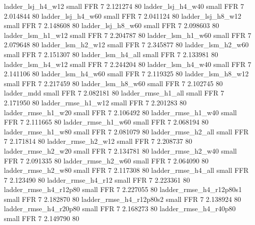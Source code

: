        ladder_lsj_h4_w12      small      FFR                 7 2.121274 80
       ladder_lsj_h4_w40      small      FFR                 7 2.014844 80
       ladder_lsj_h4_w60      small      FFR                 7 2.041124 80
       ladder_lsj_h8_w12      small      FFR                 7 2.148608 80
       ladder_lsj_h8_w60      small      FFR                 7 2.098603 80
       ladder_lsm_h1_w12      small      FFR                 7 2.204787 80
       ladder_lsm_h1_w60      small      FFR                 7 2.079648 80
       ladder_lsm_h2_w12      small      FFR                 7 2.345877 80
       ladder_lsm_h2_w60      small      FFR                 7 2.151307 80
       ladder_lsm_h4_all      small      FFR                 7 2.133981 80
       ladder_lsm_h4_w12      small      FFR                 7 2.244204 80
       ladder_lsm_h4_w40      small      FFR                 7 2.141106 80
       ladder_lsm_h4_w60      small      FFR                 7 2.119325 80
       ladder_lsm_h8_w12      small      FFR                 7 2.217459 80
       ladder_lsm_h8_w60      small      FFR                 7 2.102745 80
              ladder_mdd      small      FFR                 7 2.082181 80
      ladder_rmse_h1_all      small      FFR                 7 2.171950 80
      ladder_rmse_h1_w12      small      FFR                 7 2.201283 80
      ladder_rmse_h1_w20      small      FFR                 7 2.106492 80
      ladder_rmse_h1_w40      small      FFR                 7 2.111665 80
      ladder_rmse_h1_w60      small      FFR                 7 2.068194 80
      ladder_rmse_h1_w80      small      FFR                 7 2.081079 80
      ladder_rmse_h2_all      small      FFR                 7 2.171814 80
      ladder_rmse_h2_w12      small      FFR                 7 2.208737 80
      ladder_rmse_h2_w20      small      FFR                 7 2.134781 80
      ladder_rmse_h2_w40      small      FFR                 7 2.091335 80
      ladder_rmse_h2_w60      small      FFR                 7 2.064090 80
      ladder_rmse_h2_w80      small      FFR                 7 2.117308 80
      ladder_rmse_h4_all      small      FFR                 7 2.123490 80
      ladder_rmse_h4_r12      small      FFR                 7 2.223361 80
   ladder_rmse_h4_r12p80      small      FFR                 7 2.227055 80
 ladder_rmse_h4_r12p80s1      small      FFR                 7 2.182870 80
 ladder_rmse_h4_r12p80s2      small      FFR                 7 2.138924 80
   ladder_rmse_h4_r20p80      small      FFR                 7 2.168273 80
   ladder_rmse_h4_r40p80      small      FFR                 7 2.149790 80
